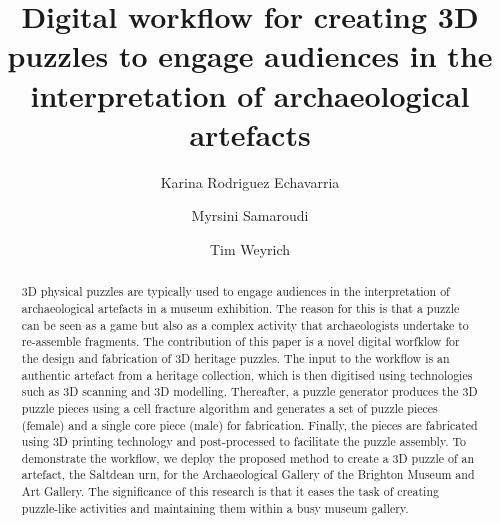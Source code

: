\documentclass[acmlarge,screen,dvipsnames]{acmart}
\begin{document}
%
\title[Digital workflow for creating 3D puzzles]%
      {Digital workflow for creating 3D puzzles to engage audiences in the interpretation of archaeological artefacts}
%
\author{Karina Rodriguez Echavarria}

\author{Myrsini Samaroudi}

\author{Tim Weyrich}


%
\renewcommand{\shortauthors}{[K. Rodriguez Echavarria, M. Samaroudi \& T. Weyrich}

%
\begin{abstract}
3D physical puzzles are typically used to engage audiences in the
interpretation of archaeological artefacts in a museum exhibition. The
reason for this is that a puzzle can be seen as a game but also as a
complex activity that archaeologists undertake to re-assemble
fragments. The contribution of this paper is a novel digital worfklow
for the design and fabrication of 3D heritage puzzles. The input to
the workflow is an authentic artefact from a heritage collection,
which is then digitised using technologies such as 3D scanning and 3D
modelling. Thereafter, a puzzle generator produces the 3D puzzle
pieces using a cell fracture algorithm and generates a set of puzzle
pieces (female) and a single core piece (male) for
fabrication. Finally, the pieces are fabricated using 3D printing
technology and post-processed to facilitate the puzzle assembly. To
demonstrate the workflow, we deploy the proposed method to create a 3D
puzzle of an artefact, the Saltdean urn, for the Archaeological
Gallery of the Brighton Museum and Art Gallery. The significance of
this research is that it eases the task of creating puzzle-like
activities and maintaining them within a busy museum gallery.
\end{abstract}
\end{document}
